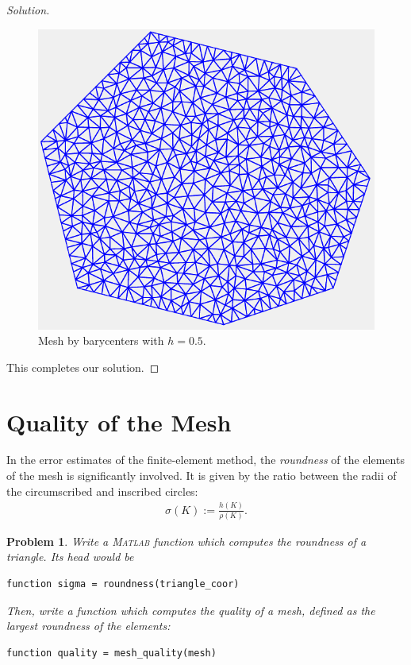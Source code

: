 \documentclass[11pt,a4paper,center,notitlepage]{article}
\numberwithin{equation}{section}
\newtheorem{prob}{Problem}[section]
\begin{document}
\begin{proof}[Solution]
\begin{figure}[H]
\centering
\includegraphics[scale=0.9]{mesh_by_barycenter_05}
\caption{Mesh by barycenters with $h=0.5$.}
\end{figure}
This completes our solution.
\end{proof}

\section{Quality of the Mesh} 
In the error estimates of the finite-element method, the \textit{roundness} of the elements of the mesh is significantly involved. It is given by the ratio between the radii of the circumscribed and inscribed circles:
\begin{align}
\sigma \left( K \right) := \frac{{h\left( K \right)}}{{\rho \left( K \right)}}.
\end{align}

\begin{prob}
Write a \textsc{Matlab} function which computes the roundness of a triangle. Its head would be
\begin{verbatim}
function sigma = roundness(triangle_coor)
\end{verbatim}
Then, write a function which computes the quality of a mesh, defined as the largest roundness of the elements:
\begin{verbatim}
function quality = mesh_quality(mesh)
\end{verbatim}
\end{prob}
\end{document}
